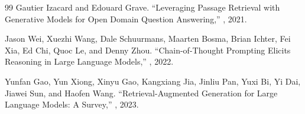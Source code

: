 \begin{thebibliography}{99}
Gautier Izacard and Edouard Grave.
\newblock ``Leveraging Passage Retrieval with Generative Models for Open Domain
Question Answering,''
, 2021.
 
Jason Wei, Xuezhi Wang, Dale Schuurmans, Maarten Bosma, Brian Ichter,
Fei Xia, Ed Chi, Quoc Le, and Denny Zhou.
\newblock ``Chain-of-Thought Prompting Elicits Reasoning in Large Language Models,''
, 2022.
 
Yunfan Gao, Yun Xiong, Xinyu Gao, Kangxiang Jia, Jinliu Pan, Yuxi Bi,
Yi Dai, Jiawei Sun, and Haofen Wang.
\newblock ``Retrieval-Augmented Generation for Large Language Models: A Survey,''
, 2023.
 
\end{thebibliography}
